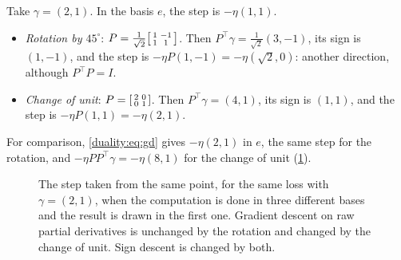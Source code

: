 \begin{notechapter}
\begin{example}
\label{duality:ex:sign}
Take $\gamma = (2, 1)$. In the basis $e$, the step is $-\eta(1, 1)$.
\begin{itemize}[nosep]
  \item \emph{Rotation by $45^\circ$}:
        $P = \frac1{\sqrt2}\begin{bsmallmatrix}1 & -1\\1 & 1
        \end{bsmallmatrix}$. Then
        $P^\top\gamma = \frac1{\sqrt2}(3, -1)$, its sign is $(1, -1)$, and
        the step is $-\eta P(1, -1) = -\eta(\sqrt2, 0)$: another
        direction, although $P^\top P = I$.
  \item \emph{Change of unit}: $P = \begin{bsmallmatrix}2 & 0\\0 & 1
        \end{bsmallmatrix}$. Then $P^\top\gamma = (4, 1)$, its sign is
        $(1, 1)$, and the step is $-\eta P(1, 1) = -\eta(2, 1)$.
\end{itemize}
For comparison, \eqref{duality:eq:gd} gives $-\eta(2, 1)$ in $e$, the same
step for the rotation, and $-\eta PP^\top\gamma = -\eta(8, 1)$ for the
change of unit (\cref{duality:fig:basis-test}).
\end{example}

\begin{figure}[ht]
\centering
{}
\caption{The step taken from the same point, for the same loss with
$\gamma = (2, 1)$, when the computation is done in three different bases
and the result is drawn in the first one. Gradient descent on raw partial
derivatives is unchanged by the rotation and changed by the change of
unit. Sign descent is changed by both.}
\label{duality:fig:basis-test}
\end{figure}


\end{notechapter}
